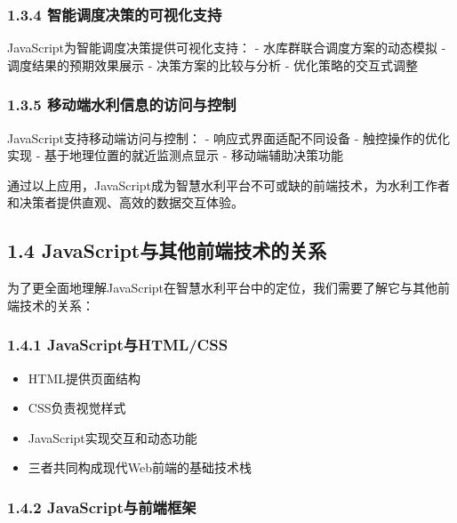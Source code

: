 \subsubsection{1.3.4
智能调度决策的可视化支持}\label{ux667aux80fdux8c03ux5ea6ux51b3ux7b56ux7684ux53efux89c6ux5316ux652fux6301}

JavaScript为智能调度决策提供可视化支持： - 水库群联合调度方案的动态模拟
- 调度结果的预期效果展示 - 决策方案的比较与分析 - 优化策略的交互式调整

\subsubsection{1.3.5
移动端水利信息的访问与控制}\label{ux79fbux52a8ux7aefux6c34ux5229ux4fe1ux606fux7684ux8bbfux95eeux4e0eux63a7ux5236}

JavaScript支持移动端访问与控制： - 响应式界面适配不同设备 -
触控操作的优化实现 - 基于地理位置的就近监测点显示 - 移动端辅助决策功能

通过以上应用，JavaScript成为智慧水利平台不可或缺的前端技术，为水利工作者和决策者提供直观、高效的数据交互体验。

\subsection{1.4
JavaScript与其他前端技术的关系}\label{javascriptux4e0eux5176ux4ed6ux524dux7aefux6280ux672fux7684ux5173ux7cfb}

为了更全面地理解JavaScript在智慧水利平台中的定位，我们需要了解它与其他前端技术的关系：

\subsubsection{1.4.1
JavaScript与HTML/CSS}\label{javascriptux4e0ehtmlcss}

\begin{itemize}
\tightlist
\item
  HTML提供页面结构
\item
  CSS负责视觉样式
\item
  JavaScript实现交互和动态功能
\item
  三者共同构成现代Web前端的基础技术栈
\end{itemize}

\subsubsection{1.4.2
JavaScript与前端框架}\label{javascriptux4e0eux524dux7aefux6846ux67b6}

